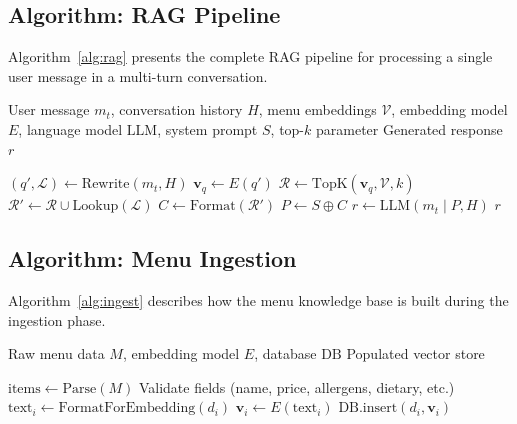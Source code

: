 \subsection{Algorithm: RAG Pipeline}

Algorithm~\ref{alg:rag} presents the complete RAG pipeline for processing a single user message in a multi-turn conversation.

\begin{algorithm}
\caption{AskTheMenu RAG Pipeline}\label{alg:rag}
\begin{algorithmic}[1]
\REQUIRE User message $m_t$, conversation history $H$, menu embeddings $\mathcal{V}$, embedding model $E$, language model $\text{LLM}$, system prompt $S$, top-$k$ parameter
\ENSURE Generated response $r$

\STATE $(q', \mathcal{L}) \leftarrow \text{Rewrite}(m_t, H)$ 
\STATE $\mathbf{v}_q \leftarrow E(q')$ 
\STATE $\mathcal{R} \leftarrow \text{TopK}(\mathbf{v}_q, \mathcal{V}, k)$ 
\STATE $\mathcal{R}' \leftarrow \mathcal{R} \cup \text{Lookup}(\mathcal{L})$ 
\STATE $C \leftarrow \text{Format}(\mathcal{R}')$ 
\STATE $P \leftarrow S \oplus C$ 
\STATE $r \leftarrow \text{LLM}(m_t \mid P, H)$ 
\Return $r$
\end{algorithmic}
\end{algorithm}

\subsection{Algorithm: Menu Ingestion}

Algorithm~\ref{alg:ingest} describes how the menu knowledge base is built during the ingestion phase.

\begin{algorithm}
\caption{Menu Data Ingestion}\label{alg:ingest}
\begin{algorithmic}[1]
\REQUIRE Raw menu data $M$, embedding model $E$, database $\text{DB}$
\ENSURE Populated vector store

\STATE $\text{items} \leftarrow \text{Parse}(M)$ 
    \STATE Validate fields (name, price, allergens, dietary, etc.)
    \STATE $\text{text}_i \leftarrow \text{FormatForEmbedding}(d_i)$
    \STATE $\mathbf{v}_i \leftarrow E(\text{text}_i)$
    \STATE $\text{DB.insert}(d_i, \mathbf{v}_i)$ 
\ENDFOR
\end{algorithmic}
\end{algorithm}
